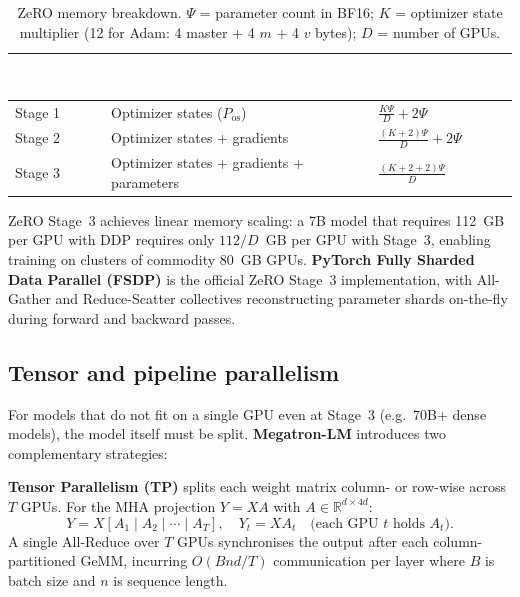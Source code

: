 \documentclass[11pt,a4paper]{article}
\begin{document}
	\begin{table}[ht]
		\centering
		\small\sffamily
		\renewcommand{\arraystretch}{1.3}
		\begin{tabular}{@{}L{2.5cm} L{5cm} L{5cm}@{}}
			\toprule
			\textcolor{white}{\textbf{ZeRO Stage}} &
			\textcolor{white}{\textbf{What is sharded}} &
			\textcolor{white}{\textbf{Memory per GPU}} \\
			\midrule
			Stage 1 & Optimizer states ($P_{\mathrm{os}}$) & $\frac{K \Psi}{D} + 2\Psi$ \\
			Stage 2 & Optimizer states + gradients & $\frac{(K+2)\Psi}{D} + 2\Psi$ \\
			Stage 3 & Optimizer states + gradients + parameters & $\frac{(K+2+2)\Psi}{D}$ \\
			\bottomrule
		\end{tabular}
		\caption{ZeRO memory breakdown. $\Psi$ = parameter count in BF16; $K$ = optimizer state multiplier (12 for Adam: 4 master + 4 $m$ + 4 $v$ bytes); $D$ = number of GPUs.}
		\label{tab:zero_stages}
	\end{table}

	ZeRO Stage~3 achieves linear memory scaling: a 7B model that requires 112~GB per GPU with DDP requires only $112/D$~GB per GPU with Stage~3, enabling training on clusters of commodity 80~GB GPUs. \textbf{PyTorch Fully Sharded Data Parallel (FSDP)} is the official ZeRO Stage~3 implementation, with All-Gather and Reduce-Scatter collectives reconstructing parameter shards on-the-fly during forward and backward passes.

	\subsection{Tensor and pipeline parallelism}

	For models that do not fit on a single GPU even at Stage~3 (e.g.\ 70B+ dense models), the model itself must be split. \textbf{Megatron-LM} \parencite{shoeybi2019megatron, narayanan2021megatron} introduces two complementary strategies:

	\textbf{Tensor Parallelism (TP)} splits each weight matrix column- or row-wise across $T$ GPUs. For the MHA projection $Y = XA$ with $A \in \mathbb{R}^{d \times 4d}$:
	\begin{equation}
		Y = X [A_1 \mid A_2 \mid \cdots \mid A_T], \quad Y_t = X A_t \quad \text{(each GPU $t$ holds $A_t$)}.
	\end{equation}
	A single All-Reduce over $T$ GPUs synchronises the output after each column-partitioned GeMM, incurring $O(Bnd/T)$ communication per layer where $B$ is batch size and $n$ is sequence length.
\end{document}
